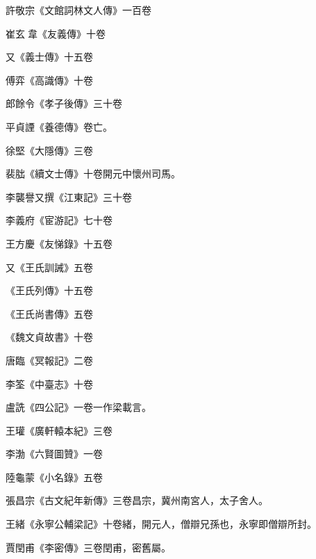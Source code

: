 \begin{pinyinscope}
 許敬宗《文館詞林文人傳》一百卷



 崔玄韋《友義傳》十卷



 又《義士傳》十五卷



 傅弈《高識傳》十卷



 郎餘令《孝子後傳》三十卷



 平貞諲《養德傳》卷亡。



 徐堅《大隱傳》三卷



 裴朏《續文士傳》十卷開元中懷州司馬。



 李襲譽又撰《江東記》三十卷



 李義府《宦游記》七十卷



 王方慶《友悌錄》十五卷



 又《王氏訓誡》五卷



 《王氏列傳》十五卷



 《王氏尚書傳》五卷



 《魏文貞故書》十卷



 唐臨《冥報記》二卷



 李筌《中臺志》十卷



 盧詵《四公記》一卷一作梁載言。



 王瓘《廣軒轅本紀》三卷



 李渤《六賢圖贊》一卷



 陸龜蒙《小名錄》五卷



 張昌宗《古文紀年新傳》三卷昌宗，冀州南宮人，太子舍人。



 王緒《永寧公輔梁記》十卷緒，開元人，僧辯兄孫也，永寧即僧辯所封。



 賈閏甫《李密傳》三卷閏甫，密舊屬。




\end{pinyinscope}
